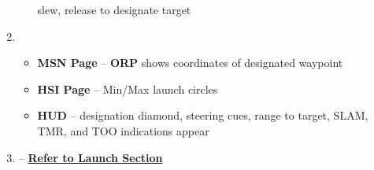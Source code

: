 \documentclass[fontInter]{TechCheck}
\begin{document}
\begin{enumerate}[leftmargin=0.1\textwidth, rightmargin=0.1\textwidth, itemsep=4pt, label=\textbf{\arabic*.}]
\begin{enumerate}[itemsep=4pt]
			\hfill slew, release to designate target
		\end{enumerate}
		\item {}
		\begin{itemize}
			\item \textbf{MSN Page} -- \textbf{ORP} shows coordinates of designated waypoint
			\item \textbf{HSI Page} -- Min/Max launch circles
			\item \textbf{HUD} -- designation diamond, steering cues, range to target, SLAM, TMR, and TOO indications appear
		\end{itemize}
		\item  {} -- \hyperref[subsec:slamlaunch]{\textbf{Refer to Launch Section}} 
	\end{enumerate}


	\clearpage
\end{document}
